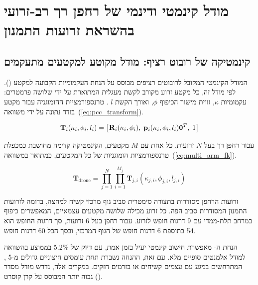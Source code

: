 

\section{מודל קינמטי ודינמי של רחפן רך רב-זרועי בהשראת זרועות התמנון}
\label{sec:kinematics}

\subsection{קינמטיקה של רובוט רציף: מודל מקוטע למקטעים מתעקמים}
\label{sec:kinematics_pcc}

המודל הקינמטי המקובל לרובוטים רציפים מבוסס על הנחת העקמומיות הקבועה למקטע (). לפי מודל זה, כל מקטע זרוע מקורב לקשת מעגלית המתוארת על ידי שלושה פרמטרים: עקמומיות $\kappa$, זווית מישור הכיפוף $\phi$, ואורך הקשת $l$ \cite{Webster2010}. טרנספורמציית ההומוגניה עבור מקטע בודד נתונה על ידי משוואה~(\ref{eq:pcc_transform}).

\begin{equation}
\mathbf{T}_i(\kappa_i, \phi_i, l_i) = \left[\mathbf{R}_i(\kappa_i, \phi_i),\; \mathbf{p}_i(\kappa_i, \phi_i, l_i) \\ \mathbf{0}^T,\; 1\right]
\label{eq:pcc_transform}
\end{equation}

עבור רחפן רך בעל $N$ זרועות, כל אחת עם $M$ מקטעים, הקינמטיקה קדימה מחושבת כמכפלת טרנספורמציות הומוגניות של כל המקטעים, כמתואר במשוואה~(\ref{eq:multi_arm_fk}).

\begin{equation}
\mathbf{T}_{\text{drone}} = \prod_{j=1}^{N} \prod_{i=1}^{M_j} \mathbf{T}_{j,i}(\kappa_{j,i}, \phi_{j,i}, l_{j,i})
\label{eq:multi_arm_fk}
\end{equation}

זרועות הרחפן מסודרות בתצורה סימטרית סביב גוף מרכזי קשיח למחצה, בדומה לזרועות התמנון המסודרות סביב הפה. כל זרוע מכילה שלושה מקטעים עצמאיים, המאפשרים כיפוף במרחב תלת-ממדי עם 9 דרגות חופש לזרוע. עבור רחפן בעל 6 זרועות, סך דרגות החופש הוא 54 בתוספת 6 דרגות חופש של הגוף המרכזי, ובסך הכל 60 דרגות חופש.

הנחת ה- מאפשרת חישוב קינמטי יעיל בזמן אמת, עם דיוק של 5.2\% בממוצע בהשוואה למודל אלמנטים סופיים מלא. עם זאת, ההנחה נשברת תחת עומסים חיצוניים גדולים מ-5 , המתרחשים במגע עם עצמים קשיחים או בזרמים חזקים. במקרים אלה, נדרש מודל מסדר גבוה יותר המבוסס על קרן קוסרט ().


